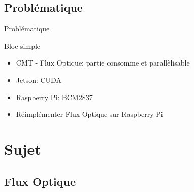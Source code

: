 \documentclass{bredelebeamer}
\begin{document}
	\subsection{Problématique}
\begin{frame}{Problématique}
\begin{block}{Bloc simple}
\begin{itemize}
\item CMT - Flux Optique: partie consomme et parallèlisable
\item Jetson: CUDA
\item Raspberry Pi: BCM2837
\item Réimplémenter Flux Optique sur Raspberry Pi
\end{itemize}
\end{block}
\end{frame}




\section{Sujet}
	\subsection{Flux Optique}
\end{document}
